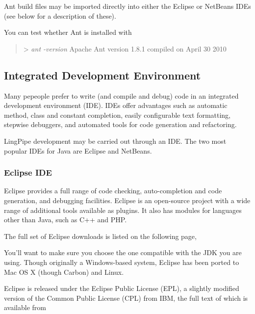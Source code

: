 Ant build files may be imported directly into either the Eclipse or
NetBeans IDEs (see below for a description of these).

You can test whether Ant is installed with

\begin{quote}
{\small\ttfamily
> {\it\ttfamily ant -version}
Apache Ant version 1.8.1 compiled on April 30 2010
}
\end{quote}

\subsection{Integrated Development Environment}

Many pepeople prefer to write (and compile and debug) code in an
integrated development environment (IDE).  IDEs offer advantages such
as automatic method, class and constant completion, easily
configurable text formatting, stepwise debuggers, and automated tools
for code generation and refactoring.

LingPipe development may be carried out through an IDE.  The two most
popular IDEs for Java are Eclipse and NetBeans.

\subsubsection{Eclipse IDE}

Eclipse provides a full range of code checking, auto-completion
and code generation, and debugging facilities.  Eclipse is an open-source
project with a wide range of additional tools available as plugins.  It
also has modules for languages other than Java, such as C++ and PHP.

The full set of Eclipse downloads is listed on the following page,
%
\begin{quote}
\end{quote}
%
You'll want to make sure you choose the one compatible with the JDK
you are using.  Though originally a Windows-based system, Eclipse has been
ported to Mac OS X (though Carbon) and Linux.  

Eclipse is released under the Eclipse Public License (EPL), a slightly modified
version of the Common Public License (CPL) from IBM, the full text of which is
available from
%
\begin{quote}
\end{quote}


